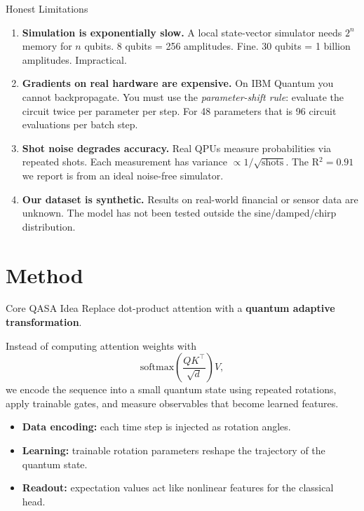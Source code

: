 \documentclass[aspectratio=169,professionalfonts]{beamer}
\begin{document}
\begin{frame}{Honest Limitations}
\begin{enumerate}
  \item \textbf{Simulation is exponentially slow.}
    A local state-vector simulator needs $2^n$ memory for $n$ qubits. 8 qubits = 256 amplitudes. Fine. 30 qubits = 1 billion amplitudes. Impractical.

  \vspace{0.4em}
  \item \textbf{Gradients on real hardware are expensive.}
    On IBM Quantum you cannot backpropagate. You must use the \emph{parameter-shift rule}: evaluate the circuit twice per parameter per step. For 48 parameters that is 96 circuit evaluations per batch step.

  \vspace{0.4em}
  \item \textbf{Shot noise degrades accuracy.}
    Real QPUs measure probabilities via repeated shots. Each measurement has variance $\propto 1/\sqrt{\text{shots}}$. The R$^2 = 0.91$ we report is from an ideal noise-free simulator.

  \vspace{0.4em}
  \item \textbf{Our dataset is synthetic.}
    Results on real-world financial or sensor data are unknown. The model has not been tested outside the sine/damped/chirp distribution.
\end{enumerate}
\end{frame}

\section{Method}

\begin{frame}{Core QASA Idea}
\Large
Replace dot-product attention with a \textbf{quantum adaptive transformation}.

\vspace{0.7em}
\normalsize
Instead of computing attention weights with
\[
\mathrm{softmax}\!\left(\frac{QK^\top}{\sqrt{d}}\right)V,
\]
we encode the sequence into a small quantum state using repeated rotations, apply trainable gates, and measure observables that become learned features.

\vspace{0.6em}
\begin{itemize}
  \item \textbf{Data encoding:} each time step is injected as rotation angles.
  \item \textbf{Learning:} trainable rotation parameters reshape the trajectory of the quantum state.
  \item \textbf{Readout:} expectation values act like nonlinear features for the classical head.
\end{itemize}
\end{frame}
\end{document}
